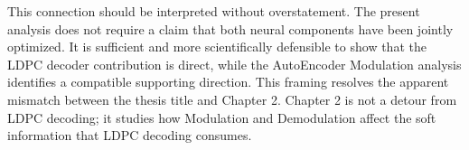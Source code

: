This connection should be interpreted without overstatement. The present analysis does not require a claim that both neural components have been jointly optimized. It is sufficient and more scientifically defensible to show that the LDPC decoder contribution is direct, while the AutoEncoder Modulation analysis identifies a compatible supporting direction. This framing resolves the apparent mismatch between the thesis title and Chapter 2. Chapter 2 is not a detour from LDPC decoding; it studies how Modulation and Demodulation affect the soft information that LDPC decoding consumes.
